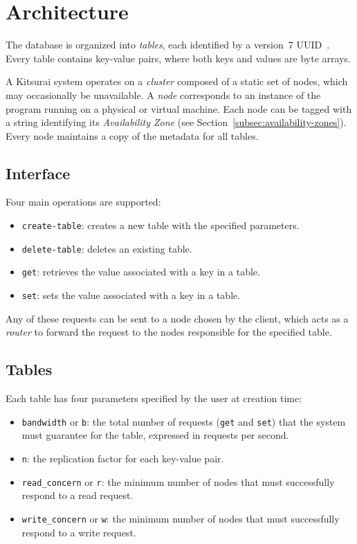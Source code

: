 \section{Architecture}
\label{sec:architecture}

The database is organized into \emph{tables}, each identified by a version~7 UUID~\cite{rfc9562}.
Every table contains key-value pairs, where both keys and values are byte arrays.

A Kitsurai system operates on a \emph{cluster} composed of a static set of nodes, which may occasionally be unavailable.
A \emph{node} corresponds to an instance of the program running on a physical or virtual machine.
Each node can be tagged with a string identifying its \emph{Availability Zone} (see Section~\ref{subsec:availability-zones}).
Every node maintains a copy of the metadata for all tables.

\subsection{Interface}
\label{subsec:interface}

Four main operations are supported:
\begin{itemize}
    \item \texttt{create-table}: creates a new table with the specified parameters.
    \item \texttt{delete-table}: deletes an existing table.
    \item \texttt{get}: retrieves the value associated with a key in a table.
    \item \texttt{set}: sets the value associated with a key in a table.
\end{itemize}

Any of these requests can be sent to a node chosen by the client, which acts as a \emph{router} to forward the request to the nodes responsible for the specified table.

\subsection{Tables}
\label{subsec:tables}

Each table has four parameters specified by the user at creation time:
\begin{itemize}
    \item \texttt{bandwidth} or \texttt{b}: the total number of requests (\texttt{get} and \texttt{set}) that the system must guarantee for the table, expressed in requests per second.
    \item \texttt{n}: the replication factor for each key-value pair.
    \item \texttt{read\_concern} or \texttt{r}: the minimum number of nodes that must successfully respond to a read request.
    \item \texttt{write\_concern} or \texttt{w}: the minimum number of nodes that must successfully respond to a write request.
\end{itemize}

